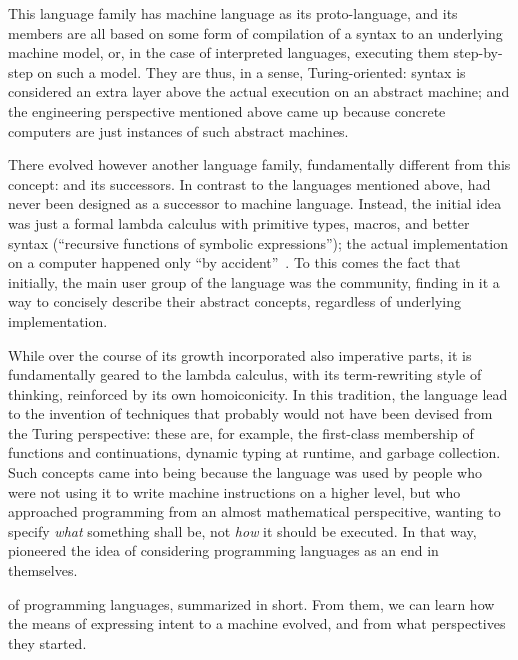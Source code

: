 This language family has machine language as its proto-language, and its members are all based on
some form of compilation of a syntax to an underlying machine model, or, in the case of interpreted
languages, executing them step-by-step on such a model. They are thus, in a sense, Turing-oriented:
syntax is considered an extra layer above the actual execution on an abstract machine; and the
engineering perspective mentioned above came up because concrete computers are just instances of
such abstract machines.

There evolved however another language family, fundamentally different from this concept:
 and its successors. In contrast to the languages mentioned above,  had
never been designed as a successor to machine language. Instead, the initial idea was just a formal
lambda calculus with primitive types, macros, and better syntax (\enquote{recursive functions of
  symbolic expressions}); the actual implementation on a computer happened only \enquote{by
  accident}~\cite{mccarthy1960:recursive}. To this comes the fact that initially, the main user
group of the language was the  community, finding in it a way to concisely describe their
abstract concepts, regardless of underlying implementation.

While  over the course of its growth incorporated also imperative parts, it is
fundamentally geared to the lambda calculus, with its term-rewriting style of thinking, reinforced
by its own homoiconicity. In this tradition, the language lead to the invention of techniques that
probably would not have been devised from the Turing perspective: these are, for example, the
first-class membership of functions and continuations, dynamic typing at runtime, and garbage
collection. Such concepts came into being because the language was used by people who were not using
it to write machine instructions on a higher level, but who approached programming from an almost
mathematical perspecitive, wanting to specify \emph{what} something shall be, not \emph{how} it
should be executed. In that way,  pioneered the idea of considering programming
languages as an end in themselves.

 of programming languages, summarized in
short. From them, we can learn how the means of expressing intent to a machine evolved, and from
what perspectives they started.

